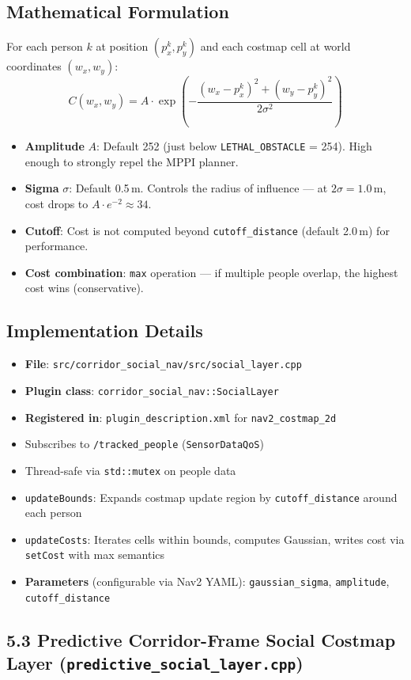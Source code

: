 \documentclass[11pt]{article}
\newcommand{\logentry}[1]{\subsection*{#1}}
\begin{document}
\logentry{Mathematical Formulation}
For each person $k$ at position $(p_x^k, p_y^k)$ and each costmap cell
at world coordinates $(w_x, w_y)$:
\[
  C(w_x, w_y) = A \cdot \exp\!\left(
    -\frac{(w_x - p_x^k)^2 + (w_y - p_y^k)^2}{2\sigma^2}
  \right)
\]
\begin{itemize}
  \item \textbf{Amplitude} $A$: Default 252 (just below \texttt{LETHAL\_OBSTACLE}
    = 254). High enough to strongly repel the MPPI planner.
  \item \textbf{Sigma} $\sigma$: Default 0.5\,m. Controls the radius of
    influence --- at $2\sigma = 1.0$\,m, cost drops to $A \cdot e^{-2} \approx
    34$.
  \item \textbf{Cutoff}: Cost is not computed beyond
    \texttt{cutoff\_distance} (default 2.0\,m) for performance.
  \item \textbf{Cost combination}: \texttt{max} operation --- if multiple people
    overlap, the highest cost wins (conservative).
\end{itemize}

\logentry{Implementation Details}
\begin{itemize}
  \item \textbf{File}: \texttt{src/corridor\_social\_nav/src/social\_layer.cpp}
  \item \textbf{Plugin class}: \texttt{corridor\_social\_nav::SocialLayer}
  \item \textbf{Registered in}: \texttt{plugin\_description.xml} for
    \texttt{nav2\_costmap\_2d}
  \item Subscribes to \texttt{/tracked\_people} (\texttt{SensorDataQoS})
  \item Thread-safe via \texttt{std::mutex} on people data
  \item \texttt{updateBounds}: Expands costmap update region by
    \texttt{cutoff\_distance} around each person
  \item \texttt{updateCosts}: Iterates cells within bounds, computes Gaussian,
    writes cost via \texttt{setCost} with max semantics
  \item \textbf{Parameters} (configurable via Nav2 YAML):
    \texttt{gaussian\_sigma}, \texttt{amplitude}, \texttt{cutoff\_distance}
\end{itemize}


\subsection*{5.3 Predictive Corridor-Frame Social Costmap Layer (\texttt{predictive\_social\_layer.cpp})}
\end{document}

